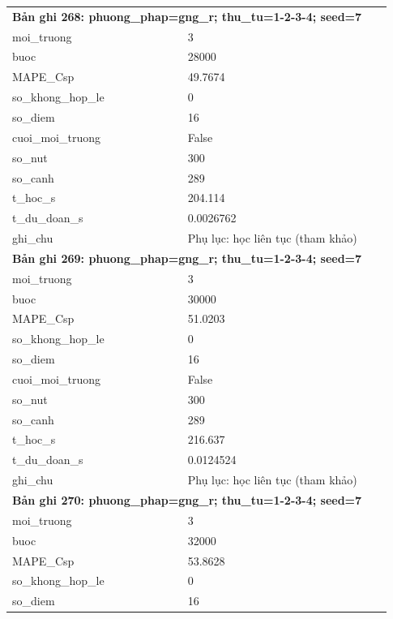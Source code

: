 \begin{longtable}{p{0.43\linewidth}p{0.50\linewidth}}
\midrule
\multicolumn{2}{p{0.95\linewidth}}{\textbf{Bản ghi 268: phuong\_phap=gng\_r; thu\_tu=1-2-3-4; seed=7}} \\
moi\_\allowbreak truong & 3 \\
buoc & 28000 \\
MAPE\_\allowbreak Csp & 49.7674 \\
so\_\allowbreak khong\_\allowbreak hop\_\allowbreak le & 0 \\
so\_\allowbreak diem & 16 \\
cuoi\_\allowbreak moi\_\allowbreak truong & False \\
so\_\allowbreak nut & 300 \\
so\_\allowbreak canh & 289 \\
t\_\allowbreak hoc\_\allowbreak s & 204.114 \\
t\_\allowbreak du\_\allowbreak doan\_\allowbreak s & 0.0026762 \\
ghi\_\allowbreak chu & Phụ lục: học liên tục (tham khảo) \\
\midrule
\multicolumn{2}{p{0.95\linewidth}}{\textbf{Bản ghi 269: phuong\_phap=gng\_r; thu\_tu=1-2-3-4; seed=7}} \\
moi\_\allowbreak truong & 3 \\
buoc & 30000 \\
MAPE\_\allowbreak Csp & 51.0203 \\
so\_\allowbreak khong\_\allowbreak hop\_\allowbreak le & 0 \\
so\_\allowbreak diem & 16 \\
cuoi\_\allowbreak moi\_\allowbreak truong & False \\
so\_\allowbreak nut & 300 \\
so\_\allowbreak canh & 289 \\
t\_\allowbreak hoc\_\allowbreak s & 216.637 \\
t\_\allowbreak du\_\allowbreak doan\_\allowbreak s & 0.0124524 \\
ghi\_\allowbreak chu & Phụ lục: học liên tục (tham khảo) \\
\midrule
\multicolumn{2}{p{0.95\linewidth}}{\textbf{Bản ghi 270: phuong\_phap=gng\_r; thu\_tu=1-2-3-4; seed=7}} \\
moi\_\allowbreak truong & 3 \\
buoc & 32000 \\
MAPE\_\allowbreak Csp & 53.8628 \\
so\_\allowbreak khong\_\allowbreak hop\_\allowbreak le & 0 \\
so\_\allowbreak diem & 16 \\

\end{longtable}
